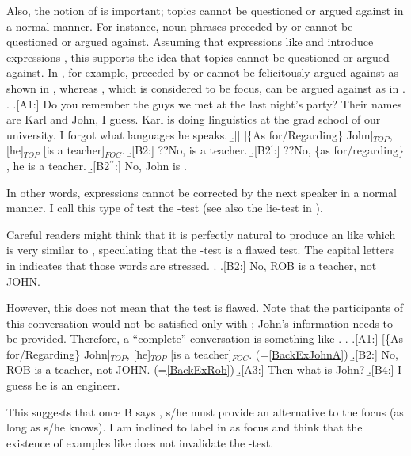 Also, the notion of  is important;
topics cannot be questioned or argued against in a normal manner.
For instance,
 noun phrases preceded by  or  cannot be questioned or argued against.
Assuming that expressions like  and  introduce  expressions \cite{kuno72,kuno76,gundel74},
this supports the idea that topics cannot be questioned or argued against.
In \Next, for example,
 preceded by  or  cannot be felicitously argued against as shown in \Next[B2,B2$^{\prime}$],
whereas , which is considered to be focus,
can be argued against as in .
%
\ex. \label{BackExJohn}\a.[A1:] Do you remember the guys we met at the last night's party?\label{BackExJohnA}
     Their names are Karl and John, I guess.
     Karl is doing linguistics at the grad school of our university.
     I forgot what languages he speaks.
     \b.[] [\{As for/Regarding\} John]$_{TOP}$, [he]$_{TOP}$ [is a teacher]$_{FOC}$.
     \b.[B2:] ??No,  is a teacher.
     \b.[B2$^{\prime}$:] ??No, \{as for/regarding\} , he is a teacher.
     \b.[B2$^{\prime\prime}$:] No, John is .

In other words,  expressions cannot be corrected by the next speaker in a normal manner.
I call this type of test the -test
 (see also the lie-test in ).

Careful readers might think that it is perfectly natural to produce an  like \Next which is very similar to \Last[B2],
speculating that the -test is a flawed test.
The capital letters in \Next indicates that
those words are stressed.
%
\ex. \a.[B2:]\label{BackExRob} No, {ROB} is a teacher, not JOHN.

However, this does not mean that the test is flawed.
Note that the participants of this conversation would not be satisfied only with \Last;
John's information needs to be provided.
Therefore, a ``complete'' conversation is something like \Next.
%
\ex. \a.[A1:] [\{As for/Regarding\} John]$_{TOP}$, [he]$_{TOP}$ [is a teacher]$_{FOC}$. \hfill{(=\ref{BackExJohnA})}
     \b.[B2:] No, {ROB} is a teacher, not JOHN. \hfill{(=\ref{BackExRob})}
     \b.[A3:] Then what is John?
     \b.[B4:] I guess he is an engineer.

This suggests that
once B says , s/he must provide an alternative to the focus (as long as s/he knows).
I am inclined to label  in \Last[B2] as focus
and think that the existence of examples like \LLast[B] does not invalidate the -test.

